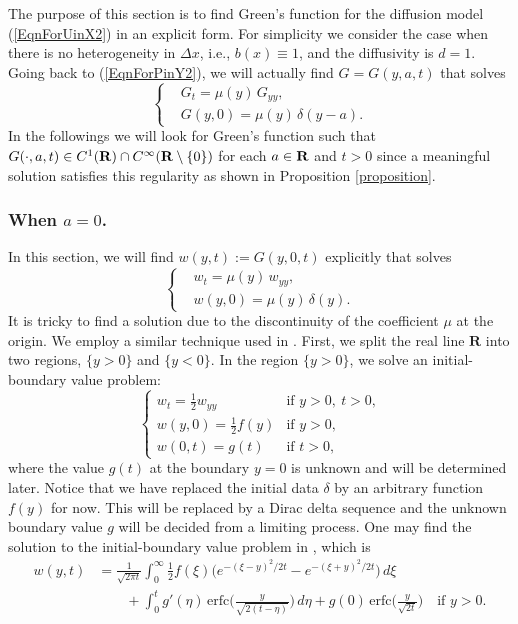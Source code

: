 \documentclass[11pt]{amsart}
\def\R{{\bf R}}
\def\d{d}
\def\R{{\bf R}}
\def\bfR{{\bf R}}
\def\erfc{\mathrm{erfc}}
\begin{document}
The purpose of this section is to find Green's function for the diffusion model (\ref{EqnForUinX2}) in an explicit form. For simplicity we consider the case when there is no heterogeneity in $\Delta x$, i.e., $b(x)\equiv 1$, and the diffusivity is $\d=1$. Going back to (\ref{EqnForPinY2}), we will actually find  $G=G(y,a,t)$ that solves
\[\left\{
\begin{aligned}
&G_t= \mu(y) \,G_{yy},\\
&G(y,0)=\mu(y) \,\delta(y-a).
\end{aligned}
\right.\]
In the followings we will look for Green's function such that $G(\cdot,a,t)\in C^1(\R)\cap C^\infty(\R\setminus\{0\})$ for each $a\in\bfR$ and $t>0$ since a meaningful solution satisfies this regularity as shown in Proposition \ref{proposition}.


\subsubsection{When $a=0$.}
In this section, we will find $w(y,t):=G(y,0,t)$ explicitly that solves
\begin{equation}\label{w0}
\left\{
\begin{aligned}
&w_t= \mu(y) \,w_{yy},\\
&w(y,0)=\mu(y) \,\delta(y).
\end{aligned}
\right.
\end{equation}
It is tricky to find a solution due to the discontinuity of the coefficient $\mu$ at the origin. We employ a similar technique used in \cite{Chung20142520}. First, we split the real line $\textbf{R}$ into two regions, $\{ y>0 \}$ and $\{ y<0 \}$. In the region $\{y>0\}$, we solve an initial-boundary value problem:
\[
\begin{cases}
w_t = \frac{1}{2} w_{yy} & \text{if $y > 0, ~t > 0$,} \\
w(y,0) = \frac{1}{2} f(y) & \text{if $y > 0$,} \\
w(0,t) = g(t) & \text{if $t > 0$,}
\end{cases}
\]
where the value $g(t)$ at the boundary $y=0$ is unknown and will be determined later. Notice that we have replaced the initial data $\delta$ by an arbitrary function $f(y)$ for now. This will be replaced by a Dirac delta sequence and the unknown boundary value $g$ will be decided from a limiting process. One may find the solution to the initial-boundary value problem in \cite[p18 and p22]{MR1728947}, which is
\[ \begin{split}
w(y,t) &= \frac{1}{\sqrt{2 \pi t}} \int_0^\infty \frac{1}{2} f(\xi) \big( e^{-(\xi-y)^2/2t} - e^{-(\xi+y)^2/2t} \big)\,d\xi \\
& \qquad + \int_0^t g'(\eta) \,\erfc\Big( \frac{y}{\sqrt{2(t-\eta)}} \Big) \,d\eta + g(0) \,\erfc\Big( \frac{y}{\sqrt{2t}} \Big) \quad \text{if $y > 0$.}
\end{split} \]
\end{document}
